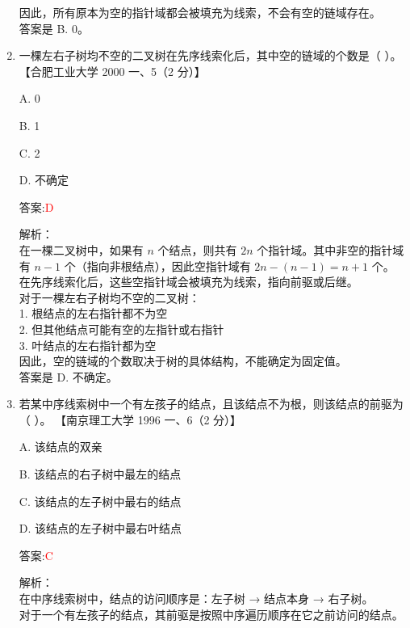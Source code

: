 \documentclass[lang=cn,newtx,10pt,scheme=chinese]{../../../elegantbook}
\begin{document}
\begin{enumerate}
    因此，所有原本为空的指针域都会被填充为线索，不会有空的链域存在。\\
    
    答案是 B. 0。\\  

    \item 一棵左右子树均不空的二叉树在先序线索化后，其中空的链域的个数是（ ）。  
    【合肥工业大学 2000 一、5（2 分）】  

    A. 0  

    B. 1 

    C. 2  

    D. 不确定  

    答案:\textcolor{red}{D}
    
    解析：\\
    在一棵二叉树中，如果有 $n$ 个结点，则共有 $2n$ 个指针域。其中非空的指针域有 $n-1$ 个（指向非根结点），因此空指针域有 $2n-(n-1)=n+1$ 个。\\
    
    在先序线索化后，这些空指针域会被填充为线索，指向前驱或后继。\\
    
    对于一棵左右子树均不空的二叉树：\\
    1. 根结点的左右指针都不为空\\
    2. 但其他结点可能有空的左指针或右指针\\
    3. 叶结点的左右指针都为空\\
    
    因此，空的链域的个数取决于树的具体结构，不能确定为固定值。\\
    
    答案是 D. 不确定。\\  

    \item 若某中序线索树中一个有左孩子的结点，且该结点不为根，则该结点的前驱为（ ）。  
    【南京理工大学 1996 一、6（2 分）】  

    A. 该结点的双亲  

    B. 该结点的右子树中最左的结点  

    C. 该结点的左子树中最右的结点  

    D. 该结点的左子树中最右叶结点  

    答案:\textcolor{red}{C}
    
    解析：\\
    在中序线索树中，结点的访问顺序是：左子树 → 结点本身 → 右子树。\\
    
    对于一个有左孩子的结点，其前驱是按照中序遍历顺序在它之前访问的结点。\\
    

\end{enumerate}
\end{document}
